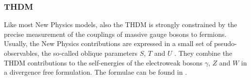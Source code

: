 \documentclass[preprint,3p,12pt]{elsarticle}
\begin{document}
{%

\subsubsection{THDM}

Like most New Physics models, also the THDM is strongly constrained by the precise measurement of the couplings of massive gauge bosons to fermions. Usually, the New Physics contributions are expressed in a small set of pseudo-observables, the so-called oblique parameters $S$, $T$ and $U$ \cite{Peskin:1990zt,Peskin:1991sw}. They combine the THDM contributions to the self-energies of the electroweak bosons $\gamma$, $Z$ and $W$ in a divergence free formulation. The formulae can be found in \cite{Haber:1993wf}.

}
\end{document}
